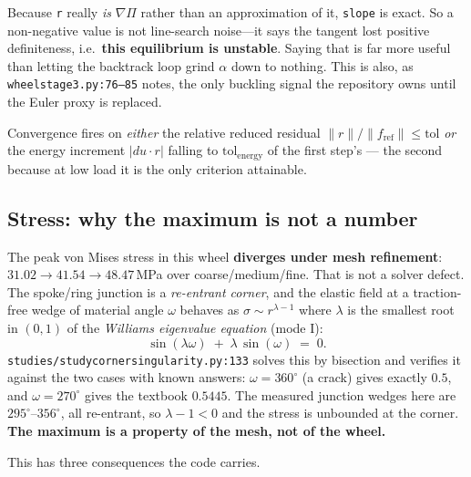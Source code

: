 \documentclass[11pt,a4paper]{article}
\DeclareRobustCommand{\code}[1]{%
  \texttt{\small\def\_{\textunderscore\discretionary{}{}{}}#1}}
\newcommand{\at}[2]{\code{#1:#2}}
\begin{document}
Because \code{r} really \emph{is} $\nabla\Pi$ rather than an approximation of it,
\code{slope} is exact. So a non-negative value is not line-search noise---it says the
tangent lost positive definiteness, i.e.\ \textbf{this equilibrium is unstable}. Saying
that is far more useful than letting the backtrack loop grind $\alpha$ down to nothing.
This is also, as \at{wheel\_stage3.py}{76--85} notes, the only buckling signal the
repository owns until the Euler proxy is replaced.

Convergence fires on \emph{either} the relative reduced residual
$\lVert r \rVert / \lVert f_{\text{ref}} \rVert \le \mathrm{tol}$ \emph{or} the energy
increment $|du \cdot r|$ falling to $\mathrm{tol}_{\text{energy}}$ of the first step's
--- the second because at low load it is the only criterion attainable.

\subsection{Stress: why the maximum is not a number}
\label{sec:stress}

The peak von Mises stress in this wheel \textbf{diverges under mesh refinement}:
$31.02 \to 41.54 \to 48.47$\,MPa over coarse/medium/fine. That is not a solver defect.
The spoke/ring junction is a \emph{re-entrant corner}, and the elastic field at a
traction-free wedge of material angle $\omega$ behaves as $\sigma \sim r^{\lambda - 1}$
where $\lambda$ is the smallest root in $(0,1)$ of the \emph{Williams eigenvalue
equation} (mode I):
%
\begin{equation}
  \sin(\lambda\omega) \;+\; \lambda\,\sin(\omega) \;=\; 0 .
  \label{eq:williams}
\end{equation}
%
\at{studies/study\_corner\_singularity.py}{133} solves this by bisection and verifies it
against the two cases with known answers: $\omega = 360^\circ$ (a crack) gives exactly
$0.5$, and $\omega = 270^\circ$ gives the textbook $0.5445$. The measured junction
wedges here are $295^\circ$--$356^\circ$, all re-entrant, so $\lambda - 1 < 0$ and the
stress is unbounded at the corner. \textbf{The maximum is a property of the mesh, not
of the wheel.}

This has three consequences the code carries.
\end{document}
